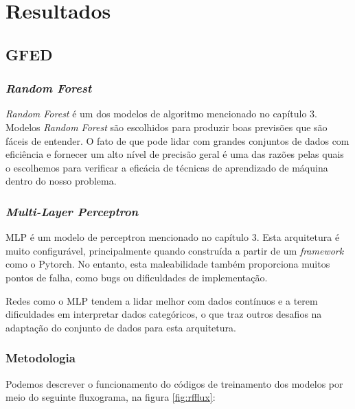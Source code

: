 \chapter{Resultados}
\label{resultados}

\section{GFED}

\subsection{\textit{Random Forest}}

\textit{Random Forest} é um dos modelos de algoritmo mencionado no capítulo 3. Modelos
\textit{Random Forest} são escolhidos para produzir boas previsões que são fáceis de entender. O fato de que pode lidar com grandes conjuntos de dados com eficiência e fornecer um alto nível de precisão geral é uma das razões pelas quais o escolhemos para verificar a eficácia de técnicas de aprendizado de máquina dentro do nosso problema.

\subsection{\textit{Multi-Layer Perceptron}}

MLP é um modelo de perceptron mencionado no capítulo 3. Esta arquitetura é muito
configurável, principalmente quando construída a partir de um \textit{framework} como o Pytorch. No entanto, esta maleabilidade também proporciona muitos pontos de falha, como bugs ou dificuldades de implementação.

Redes como o MLP tendem a lidar melhor com dados contínuos e a terem dificuldades
em interpretar dados categóricos, o que traz outros desafios na adaptação do conjunto de
dados para esta arquitetura.

\subsection{Metodologia}

Podemos descrever o funcionamento do códigos de treinamento dos modelos por meio do seguinte fluxograma, na figura \ref{fig:rfflux}:

